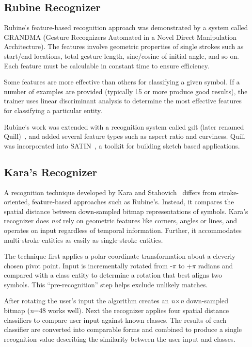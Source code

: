 \subsection{Rubine Recognizer}
\label{sec:recognition-rubine}

Rubine's feature-based recognition approach was demonstrated by a
system called GRANDMA (Gesture Recognizers Automated in a Novel Direct
Manipulation Architecture). The features involve geometric properties
of single strokes such as start/end locations, total gesture length,
sine/cosine of initial angle, and so on. Each feature must be
calculable in constant time to ensure efficiency.

Some features are more effective than others for classifying a given
symbol. If a number of examples are provided (typically 15 or more
produce good results), the trainer uses linear discriminant analysis
to determine the most effective features for classifying a particular
entity.

Rubine's work was extended with a recognition system called gdt (later
renamed Quill)~\cite{long-quill-chi}, and added several feature types
such as aspect ratio and curviness. Quill was incorporated into
SATIN~\cite{hong-satin}, a toolkit for building sketch based
applications.

\subsection{Kara's Recognizer}

A recognition technique developed by Kara and
Stahovich~\cite{kara-recognizer-cg} differs from stroke-oriented,
feature-based approaches such as Rubine's. Instead, it compares the
spatial distance between down-sampled bitmap representations of
symbols. Kara's recognizer does \textit{not} rely on geometric
features like corners, angles or lines, and operates on input
regardless of temporal information. Further, it accommodates
multi-stroke entities as easily as single-stroke entities.

The technique first applies a polar coordinate transformation about a
cleverly chosen pivot point. Input is incrementally rotated from
-$\pi$ to +$\pi$ radians and compared with a class entity to determine
a rotation that best aligns two symbols. This ``pre-recognition'' step
helps exclude unlikely matches.

After rotating the user's input the algorithm creates an
\textit{n}$\times$\textit{n} down-sampled bitmap (\textit{n}=48 works
well). Next the recognizer applies four spatial distance classifiers
to compare user input against known classes. The results of each
classifier are converted into comparable forms and combined to produce
a single recognition value describing the similarity between the user
input and classes.

